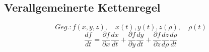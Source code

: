 \subsection{Verallgemeinerte Kettenregel}
    \vspace{-0.5em}
    $$
        Geg.: f(x,y,z),\quad x(t), y(t), z(\rho),\quad \rho(t)
    $$
    \vspace{0.25em}
    $$
        \frac{df}{dt} = \frac{\partial f}{\partial x}   \frac{dx}{dt} + \frac{\partial f}{\partial y} \frac{dy}{dt} + \frac{\partial f}{\partial z} \frac{dz}{d\rho} \frac{d\rho}{dt}
    $$